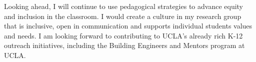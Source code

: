 \documentclass[10pt]{article}
\begin{document}
Looking ahead, I will continue to use pedagogical strategies to advance equity and inclusion in the classroom. I would create a culture in my research group that is inclusive, open in communication and supports individual students values and needs. I am looking forward to contributing to UCLA's already rich K-12 outreach initiatives, including the Building Engineers and Mentors program at UCLA.   




\end{document}
